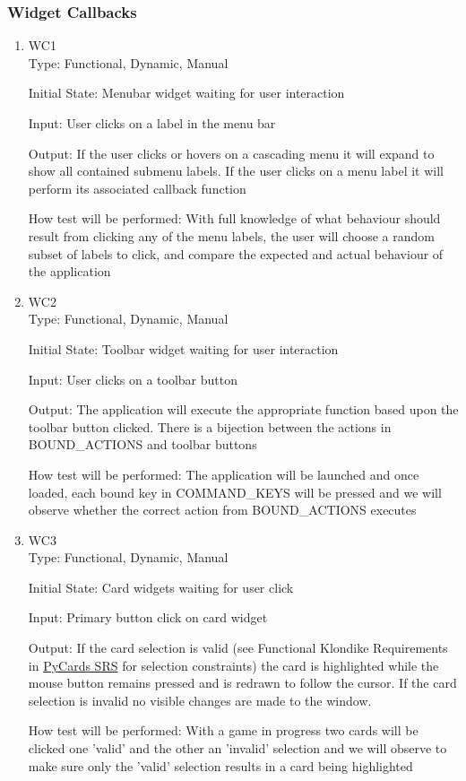 \documentclass[12pt, titlepage]{article}
\begin{document}
	\subsubsection{Widget Callbacks}
	\begin{enumerate}
		\item{WC1\\}
		Type: Functional, Dynamic, Manual
		
		Initial State: Menubar widget waiting for user interaction
		
		Input: User clicks on a label in the menu bar
		
		Output: If the user clicks or hovers on a cascading menu it will expand
		to show all contained submenu labels. If the user clicks on a menu label
		it will perform its associated callback function
		
		How test will be performed: With full knowledge of what behaviour should
		result from clicking any of the menu labels, the user will choose a random
		subset of labels to click, and compare the expected and actual behaviour of
		the application

		\item{WC2\\}
		Type: Functional, Dynamic, Manual
		
		Initial State: Toolbar widget waiting for user interaction
		
		Input: User clicks on a toolbar button
		
		Output: The application will execute the appropriate function based upon
		the toolbar button clicked. There is a bijection between the actions in
		BOUND\_ACTIONS and toolbar buttons
		
		How test will be performed: The application will be launched and once loaded,
		each bound key in COMMAND\_KEYS will be pressed and we will observe whether
		the correct action from BOUND\_ACTIONS executes

		\item{WC3\\}
		Type: Functional, Dynamic, Manual
		
		Initial State: Card widgets waiting for user click
		
		Input: Primary button click on card widget
		
		Output: If the card selection is valid (see Functional Klondike Requirements in 
		\href{https://gitlab.cas.mcmaster.ca/premaa/pysol/tree/master/Doc/SRS}
		{PyCards SRS} for selection constraints) the card is highlighted while the
		mouse button remains pressed and is redrawn to follow the cursor. If the card
		selection is invalid no visible changes are made to the window.
		
		How test will be performed: With a game in progress two cards will be clicked
		one 'valid' and the other an 'invalid' selection and we will observe to make
		sure only the 'valid' selection results in a card being highlighted	
	\end{enumerate}
\end{document}
